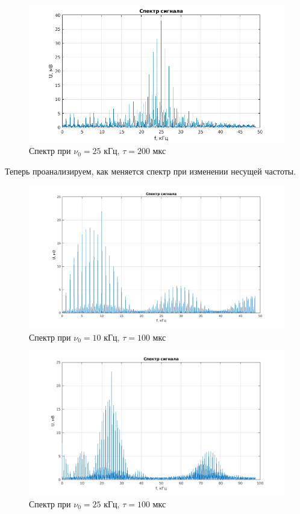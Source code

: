 \documentclass[a4paper, 12pt]{article}%
\begin{document}
\begin{figure}[h!]
    \centering
    \includegraphics[width = 14 cm]{images/2_200_1.png}
    \caption{Спектр при $\nu_0 = 25$ кГц, $\tau = 200$ мкс}
\end{figure}

Теперь проанализируем, как меняется спектр при изменении несущей частоты.

\begin{figure}[h!]
    \centering
    \includegraphics[width = 14 cm]{images/2_10k.png}
    \caption{Спектр при $\nu_0 = 10$ кГц, $\tau = 100$ мкс}
\end{figure}

\begin{figure}[h!]
    \centering
    \includegraphics[width = 14 cm]{images/2_25k.png}
    \caption{Спектр при $\nu_0 = 25$ кГц, $\tau = 100$ мкс}
\end{figure}
\end{document}
